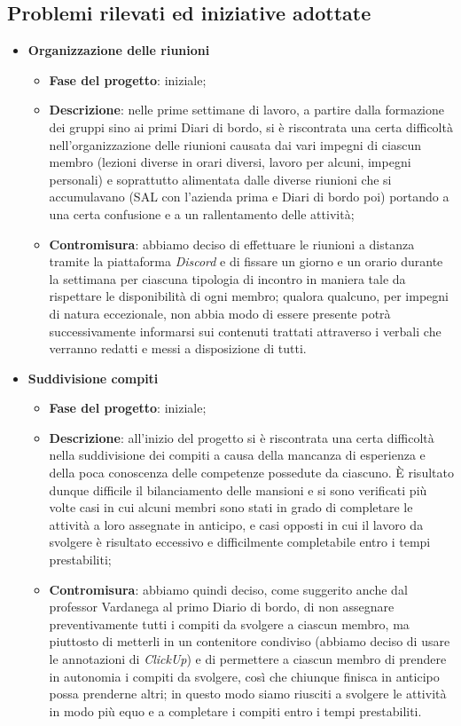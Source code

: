 \subsection{Problemi rilevati ed iniziative adottate}
\begin{itemize}
    \item \textbf{Organizzazione delle riunioni}
    \begin{itemize}
        \item \textbf{Fase del progetto}: iniziale;
        \item \textbf{Descrizione}: nelle prime settimane di lavoro, a partire dalla formazione dei gruppi sino ai primi Diari di bordo, 
        si è riscontrata una certa difficoltà nell'organizzazione delle riunioni causata dai vari impegni di ciascun membro 
        (lezioni diverse in orari diversi, lavoro per alcuni, impegni personali) e soprattutto alimentata dalle diverse riunioni che si 
        accumulavano (SAL con l'azienda prima e Diari di bordo poi) portando a una certa confusione e a un 
        rallentamento delle attività;
        \item \textbf{Contromisura}: abbiamo deciso di effettuare le riunioni a distanza tramite la piattaforma \textit{Discord} 
        e di fissare un giorno e un orario durante la settimana per ciascuna tipologia di incontro in maniera tale da
        rispettare le disponibilità di ogni membro;
        qualora qualcuno, per impegni di natura eccezionale, non abbia modo di essere presente potrà successivamente informarsi sui 
        contenuti trattati attraverso i verbali che verranno redatti e messi a disposizione di tutti.
    \end{itemize}
    \item \textbf{Suddivisione compiti}
    \begin{itemize}
        \item \textbf{Fase del progetto}: iniziale;
        \item \textbf{Descrizione}: all'inizio del progetto si è riscontrata una certa difficoltà nella suddivisione dei 
        compiti a causa della mancanza di esperienza e della poca conoscenza delle competenze possedute da ciascuno. È risultato dunque 
        difficile il bilanciamento delle mansioni e si sono verificati più volte casi in cui alcuni membri sono stati in grado di completare
        le attività a loro assegnate in anticipo, e casi opposti in cui il lavoro da svolgere è risultato eccessivo
        e difficilmente completabile entro i tempi prestabiliti;
        \item \textbf{Contromisura}: abbiamo quindi deciso, come suggerito anche dal professor Vardanega al primo Diario di bordo, 
        di non assegnare preventivamente tutti i compiti da svolgere a ciascun membro, ma piuttosto di metterli in un contenitore 
        condiviso (abbiamo deciso di usare le annotazioni di \textit{ClickUp}) e di permettere a ciascun membro di prendere in 
        autonomia i compiti da svolgere, così che chiunque finisca in anticipo possa prenderne altri; in questo modo siamo riusciti 
        a svolgere le attività in modo più equo e a completare i compiti entro i tempi prestabiliti.
    \end{itemize}
\end{itemize}
